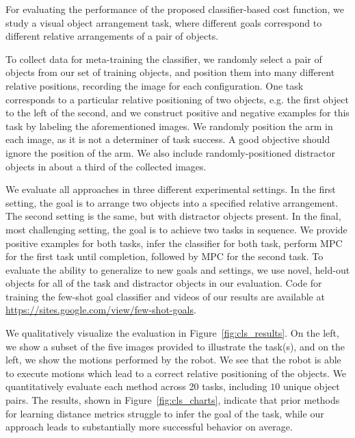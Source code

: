 For evaluating the performance of the proposed classifier-based cost function, we study a visual object arrangement task, where different goals correspond to different relative arrangements of a pair of objects. 

To collect data for meta-training the classifier, we randomly select a pair of objects from our set of training objects, and position them into many different relative positions, recording the image for each configuration. One task corresponds to a particular relative positioning of two objects, e.g. the first object to the left of the second, and we construct positive and negative examples for this task by labeling the aforementioned images. We randomly position the arm in each image, as it is not a determiner of task success. A good objective should ignore the position of the arm. We also include randomly-positioned distractor objects in about a third of the collected images.

We evaluate all approaches in three different experimental settings. In the first setting, the goal is to arrange two objects into a specified relative arrangement. The second setting is the same, but with distractor objects present. In the final, most challenging setting, the goal is to achieve two tasks in sequence. We provide positive examples for both tasks, infer the classifier for both task, perform MPC for the first task until completion, followed by MPC for the second task. To evaluate the ability to generalize to new goals and settings, we use novel, held-out objects for all of the task and distractor objects in our evaluation. Code for training the few-shot goal classifier and videos of our results are available at \url{https://sites.google.com/view/few-shot-goals}.

We qualitatively visualize the evaluation in Figure~\ref{fig:cls_results}.
On the left, we show a subset of the five images provided to illustrate the task(s), and on the left, we show the motions performed by the robot. We see that the robot is able to execute motions which lead to a correct relative positioning of the objects.
We quantitatively evaluate each method across 20 tasks, including $10$ unique object pairs. The results, shown in Figure~\ref{fig:cls_charts}, indicate that prior methods for learning distance metrics
struggle to infer the goal of the task, while our approach leads to substantially more successful behavior on average. 

